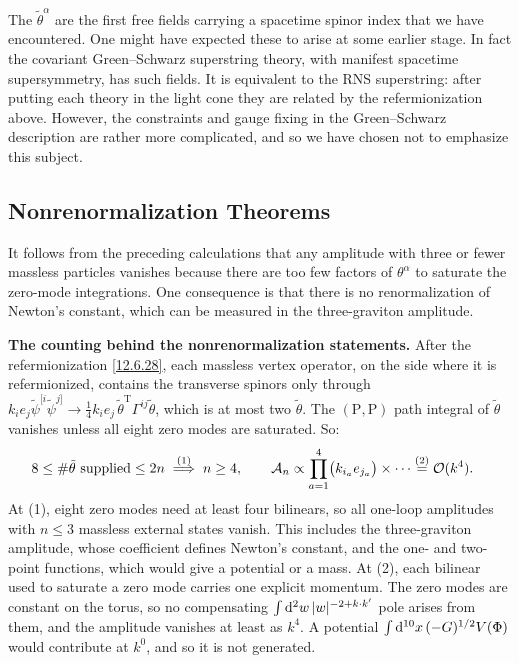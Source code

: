 The $\tilde{\theta}^\alpha$ are the first free fields carrying a spacetime spinor index that we have encountered. One might have expected these to arise at some earlier stage. In fact the covariant Green--Schwarz superstring theory, with manifest spacetime supersymmetry, has such fields. It is equivalent to the RNS superstring: after putting each theory in the light cone they are related by the refermionization above. However, the constraints and gauge fixing in the Green--Schwarz description are rather more complicated, and so we have chosen not to emphasize this subject.

\subsection*{Nonrenormalization Theorems}

It follows from the preceding calculations that any amplitude with three or fewer massless particles vanishes because there are too few factors of $\theta^\alpha$ to saturate the zero-mode integrations. One consequence is that there is no renormalization of Newton's constant, which can be measured in the three-graviton amplitude.

\begin{tcolorbox}[breakable]
	\begin{remark}
		\textbf{The counting behind the nonrenormalization statements.} After the refermionization \eqref{12.6.28}, each massless vertex operator, on the side where it is refermionized, contains the transverse spinors only through $k_{i}e_{j}\tilde\psi^{[i}\tilde\psi^{j]}\to\frac14k_{i}e_{j}\,\tilde\theta^{\mathrm T}\Gamma^{ij}\tilde\theta$, which is at most two $\tilde\theta$. The $(\mathrm P,\mathrm P)$ path integral of $\tilde\theta$ vanishes unless all eight zero modes are saturated. So:
		\begin{align*}
			8\le\#\tilde\theta\ \text{supplied}\le2n
			\;&\overset{(1)}{\Longrightarrow}\; n\ge4 ,\qquad
			\mathcal A_{n}\propto\prod_{a=1}^{4}\bigl(k_{i_a}e_{j_a}\bigr)\times\cdots
			\overset{(2)}{=} \mathcal O(k^{4}) .
		\end{align*}
		At (1), eight zero modes need at least four bilinears, so all one-loop amplitudes with $n\le3$ massless external states vanish. This includes the three-graviton amplitude, whose coefficient defines Newton's constant, and the one- and two-point functions, which would give a potential or a mass. At (2), each bilinear used to saturate a zero mode carries one explicit momentum. The zero modes are constant on the torus, so no compensating $\int\mathrm{d}^{2}w\,|w|^{-2+k\cdot k'}$ pole arises from them, and the amplitude vanishes at least as $k^{4}$. A potential $\int\mathrm{d}^{10}x\,(-G)^{1/2}V(\Phi)$ would contribute at $k^{0}$, and so it is not generated.
	\end{remark}
\end{tcolorbox}

